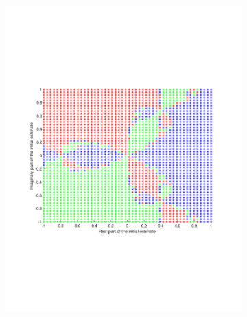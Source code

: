 \documentclass[12pt]{article} %
\begin{document}
\begin{figure}[ht!]
\begin{subfigure}{0.35\textwidth}
        \includegraphics[width=\textwidth]{fig3.pdf}
        \caption{\small }
        \label{}
    \end{subfigure}
    \begin{subfigure}{0.35\textwidth}

\end{subfigure}
\end{figure}
\end{document}

